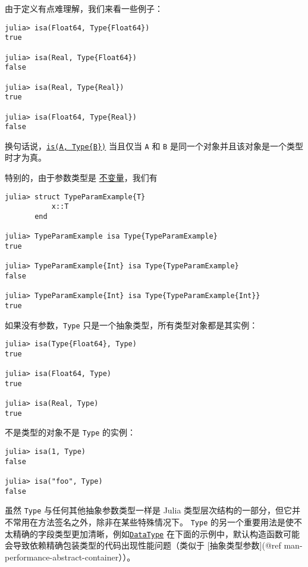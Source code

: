 由于定义有点难理解，我们来看一些例子：




\begin{verbatim}
julia> isa(Float64, Type{Float64})
true

julia> isa(Real, Type{Float64})
false

julia> isa(Real, Type{Real})
true

julia> isa(Float64, Type{Real})
false
\end{verbatim}



换句话说，\href{@ref}{\texttt{is(A, Type\{B\})}} 当且仅当 \texttt{A} 和 \texttt{B} 是同一个对象并且该对象是一个类型时才为真。



特别的，由于参数类型是 \hyperlink{17413469367194810249}{不变量}，我们有




\begin{verbatim}
julia> struct TypeParamExample{T}
           x::T
       end

julia> TypeParamExample isa Type{TypeParamExample}
true

julia> TypeParamExample{Int} isa Type{TypeParamExample}
false

julia> TypeParamExample{Int} isa Type{TypeParamExample{Int}}
true
\end{verbatim}



如果没有参数，\texttt{Type} 只是一个抽象类型，所有类型对象都是其实例：




\begin{verbatim}
julia> isa(Type{Float64}, Type)
true

julia> isa(Float64, Type)
true

julia> isa(Real, Type)
true
\end{verbatim}



不是类型的对象不是 \texttt{Type} 的实例：




\begin{verbatim}
julia> isa(1, Type)
false

julia> isa("foo", Type)
false
\end{verbatim}



虽然 \texttt{Type} 与任何其他抽象参数类型一样是 Julia 类型层次结构的一部分，但它并不常用在方法签名之外，除非在某些特殊情况下。 \texttt{Type} 的另一个重要用法是使不太精确的字段类型更加清晰，例如\hyperlink{10085633296969666313}{\texttt{DataType}} 在下面的示例中，默认构造函数可能会导致依赖精确包装类型的代码出现性能问题（类似于 [抽象类型参数](@ref man-performance-abstract-container））。




